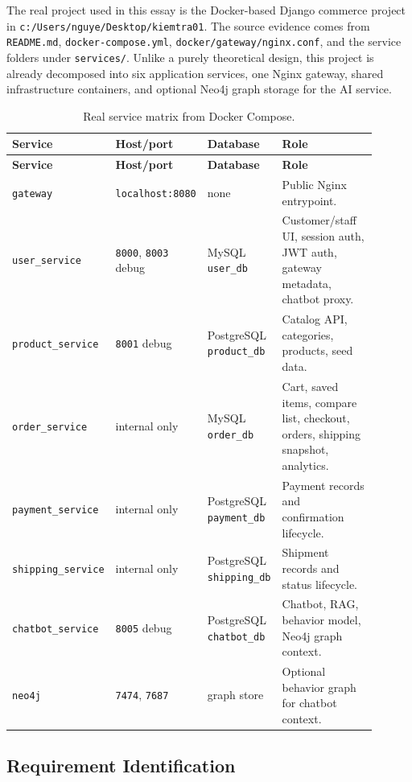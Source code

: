 \documentclass[12pt,a4paper]{article}
\newcommand{\codepath}[1]{{\small\texttt{#1}}}
\begin{document}
The real project used in this essay is the Docker-based Django commerce project in
\codepath{c:/Users/nguye/Desktop/kiemtra01}. The source evidence comes from
\codepath{README.md}, \codepath{docker-compose.yml}, \codepath{docker/gateway/nginx.conf},
and the service folders under \codepath{services/}. Unlike a purely theoretical design,
this project is already decomposed into six application services, one Nginx gateway,
shared infrastructure containers, and optional Neo4j graph storage for the AI service.

\begin{longtable}{p{0.22\linewidth}p{0.18\linewidth}p{0.18\linewidth}p{0.32\linewidth}}
\caption{Real service matrix from Docker Compose.}
\label{tab:real-service-matrix}\\
\toprule
\textbf{Service} & \textbf{Host/port} & \textbf{Database} & \textbf{Role}\\
\midrule
\endfirsthead
\toprule
\textbf{Service} & \textbf{Host/port} & \textbf{Database} & \textbf{Role}\\
\midrule
\endhead
\codepath{gateway} & \codepath{localhost:8080} & none & Public Nginx entrypoint.\\
\codepath{user\_service} & \codepath{8000}, \codepath{8003} debug & MySQL \codepath{user\_db} & Customer/staff UI, session auth, JWT auth, gateway metadata, chatbot proxy.\\
\codepath{product\_service} & \codepath{8001} debug & PostgreSQL \codepath{product\_db} & Catalog API, categories, products, seed data.\\
\codepath{order\_service} & internal only & MySQL \codepath{order\_db} & Cart, saved items, compare list, checkout, orders, shipping snapshot, analytics.\\
\codepath{payment\_service} & internal only & PostgreSQL \codepath{payment\_db} & Payment records and confirmation lifecycle.\\
\codepath{shipping\_service} & internal only & PostgreSQL \codepath{shipping\_db} & Shipment records and status lifecycle.\\
\codepath{chatbot\_service} & \codepath{8005} debug & PostgreSQL \codepath{chatbot\_db} & Chatbot, RAG, behavior model, Neo4j graph context.\\
\codepath{neo4j} & \codepath{7474}, \codepath{7687} & graph store & Optional behavior graph for chatbot context.\\
\bottomrule
\end{longtable}

\subsection{Requirement Identification}
\end{document}
